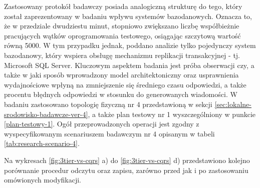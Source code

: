 Zastosowany protokół badawczy posiada analogiczną strukturę do tego, który został zaprezentowany w badaniu wpływu systemów bazodanowych. Oznacza to, że w przedziale dwudziestu minut, stopniowo zwiększano liczbę współbieżnie pracujących wątków oprogramowania testowego, osiągając szczytową wartość równą 5000. W tym przypadku jednak, poddano analizie tylko pojedynczy system bazodanowy, który wspiera obsługę mechanizmu replikacji transakcyjnej - tj. Microsoft SQL Server. Kluczowym aspektem badania jest próba obserwacji czy, a także w jaki sposób wprowadzony model architektoniczny oraz usprawnienia wydajnościowe wpłyną na zmniejszenie się średniego czasu odpowiedzi, a także procentu błędnych odpowiedzi w stosunku do generowanych wiadomości. W badaniu zastosowano topologię fizyczną nr 4 przedstawioną w sekcji \ref{sec:lokalne-srodowisko-badawcze-ver-4}, a także plan testowy nr 1 wyszczególniony w punkcie \ref{plan-testowy-1}. Ogół przeprowadzonych operacji jest zgodny z wyspecyfikowanym scenariuszem badawczym nr 4 opisanym w tabeli \ref{tab:research-scenario-4}.

Na wykresach \ref{fig:3tier-vs-cqrs} a) do \ref{fig:3tier-vs-cqrs} d) przedstawiono kolejno porównanie procedur odczytu oraz zapisu, zarówno przed jak i po zastosowaniu omówionych modyfikacji.

